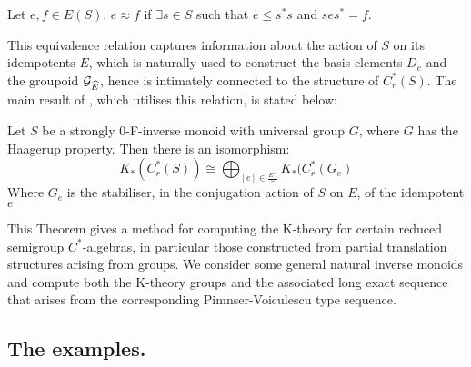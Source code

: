 \begin{definition}
Let $e,f \in E(S)$. $e \approx f$ if $\exists s \in S$ such that $e \leq s^{*}s$ and $ses^{*}=f$.
\end{definition}

This equivalence relation captures information about the action of $S$ on its idempotents $E$, which is naturally used to construct the basis elements $D_{e}$ and the groupoid $\mathcal{G}_{\widehat{E}}$, hence is intimately connected to the structure of $C^{*}_{r}(S)$. The main result of \cite{Nor-2012}, which utilises this relation, is stated below:

\begin{theorem}\label{Thm:Norling}
Let $S$ be a strongly 0-F-inverse monoid with universal group $G$, where $G$ has the Haagerup property. Then there is an isomorphism:
\begin{equation*}
K_{*}(C^{*}_{r}(S)) \cong \bigoplus_{[e]\in \frac{E^{\times}}{\approx}} K_{*}(C^{*}_{r}(G_{e})
\end{equation*}
Where $G_{e}$ is the stabiliser, in the conjugation action of $S$ on $E$, of the idempotent $e$
\end{theorem}

This Theorem gives a method for computing the K-theory for certain reduced semigroup $C^{*}$-algebras, in particular those constructed from partial translation structures arising from groups. We consider some general natural inverse monoids and compute both the K-theory groups and the associated long exact sequence that arises from the corresponding Pimnser-Voiculescu type sequence.

\subsection{The examples.}

